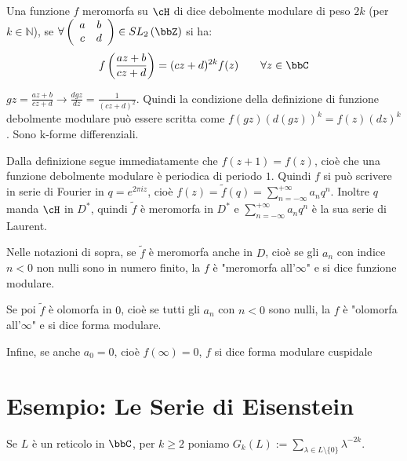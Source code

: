 \begin{definizione}
Una funzione $f$ meromorfa su $\cH$ di dice debolmente modulare di peso $2k$ (per $k \in \mathbb{N}$), se $\forall
\left( \begin{array}{cc} a & b \\ c & d \end{array} \right) \in
SL_2 \left( \bbZ \right)$ si ha:
$$ f\left( \frac{az+b}{cz+d} \right) = (cz+d)^{2k} f(z)
\qquad \forall z \in \bbC$$
\end{definizione}

\begin{osservazione}
$\displaystyle{gz=\frac{az+b}{cz+d} \rightarrow
\frac{dgz}{dz}=\frac{1}{(cz+d)^2}}$. Quindi la condizione della definizione di
funzione debolmente modulare può essere scritta come $f(gz)(d(gz))^k=f(z)(dz)^k$.
Sono k-forme differenziali.
\end{osservazione}

\begin{osservazione}
Dalla definizione segue immediatamente che $f(z+1)=f(z)$, cioè che una
funzione debolmente modulare è periodica di periodo $1$. Quindi $f$ si può scrivere in serie di Fourier in $q=e^{2 \pi i z}$, cioè
$\displaystyle{f(z)=\widetilde{f}(q)=\sum^{+\infty}_{n=-\infty}{a_n q^n}}$.
Inoltre $q$ manda $\cH$ in $D^*$, quindi $\widetilde{f}$ è meromorfa
in $D^*$ e $\displaystyle{\sum^{+\infty}_{n=-\infty}{a_n q^n}}$ è la sua
serie di Laurent.
\end{osservazione}

\begin{definizione}
Nelle notazioni di sopra, se $\widetilde{f}$ è meromorfa anche in $D$, cioè
se gli $a_n$ con indice $n<0$ non nulli sono in numero finito, la $f$
è "meromorfa all'$\infty$" e si dice funzione modulare.

Se poi $\widetilde{f}$ è olomorfa in $0$, cioè se tutti gli $a_n$ con $n<0$
sono nulli, la $f$ è "olomorfa all'$\infty$" e si dice forma modulare.

Infine, se anche $a_0=0$, cioè $f(\infty)=0$, $f$ si dice forma modulare
cuspidale
\end{definizione}

\section{Esempio: Le Serie di Eisenstein}

\begin{definizione}
Se $L$ è un reticolo in $\bbC$, per $k \geq 2$ poniamo
$G_k(L):=\displaystyle{\sum_{\lambda \in L \setminus \{ 0 \}}{\lambda ^{-2k}}}$.
\end{definizione}

